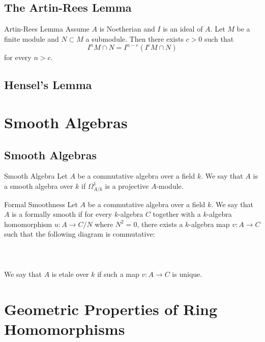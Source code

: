 \documentclass[a4paper]{article}
\begin{document}
\subsection{The Artin-Rees Lemma}
\begin{thm}{Artin-Rees Lemma}{} Assume $A$ is Noetherian and $I$ is an ideal of $A$. Let $M$ be a finite module and $N\subset M$ a submodule. Then there exists $c>0$ such that $$I^nM\cap N=I^{n-c}(I^cM\cap N)$$ for every $n>c$. 
\end{thm}

\subsection{Hensel's Lemma}

\pagebreak
\section{Smooth Algebras}
\subsection{Smooth Algebras}
\begin{defn}{Smooth Algebra}{} Let $A$ be a commutative algebra over a field $k$. We say that $A$ is a smooth algebra over $k$ if $\Omega_{A/k}^1$ is a projective $A$-module. 
\end{defn}

\begin{defn}{Formal Smoothness}{} Let $A$ be a commutative algebra over a field $k$. We say that $A$ is a formally smooth if for every $k$-algebra $C$ together with a $k$-algebra homomorphism $u:A\to C/N$ where $N^2=0$, there exists a $k$-algebra map $v:A\to C$ such that the following diagram is commutative:  \\~\\
\\~\\
We say that $A$ is etale over $k$ if such a map $v:A\to C$ is unique. 
\end{defn}

\pagebreak
\section{Geometric Properties of Ring Homomorphisms}
\end{document}
